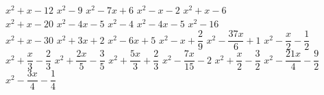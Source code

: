 \begin{esercizio}
\begin{htmulticols}{3}
\begin{enumeratea}
\end{enumeratea}
\end{htmulticols}
\noindent\! \(x^{2} + x - 12\) %
 \(x^{2} - 9\) %
 \(x^{2} - 7 x + 6\) %
 \(x^{2} - x - 2\) %
 \(x^{2} + x - 6\) \\ %
 \(x^{2} + x - 20\) %
 \(x^{2} - 4 x - 5\) %
 \(x^{2} - 4\) %
 \(x^{2} - 4 x - 5\) %
 \(x^{2} - 16\) \\ %
 \(x^{2} + x - 30\) %
 \(x^{2} + 3 x + 2\) %
 \(x^{2} - 6 x + 5\) %
 \(x^{2} - x + \dfrac{2}{9}\) %
 \(x^{2} - \dfrac{37 x}{6} + 1\) %
 \(x^{2} - \dfrac{x}{2} - \dfrac{1}{2}\) %
 \(x^{2} + \dfrac{x}{3} - \dfrac{2}{3}\) %
 \(x^{2} + \dfrac{2 x}{5} - \dfrac{3}{5}\) %
 \(x^{2} + \dfrac{5 x}{3} + \dfrac{2}{3}\) %
 \(x^{2} - \dfrac{7 x}{15} - 2\) %
 \(x^{2} + \dfrac{x}{2} - \dfrac{3}{2}\) %
 \(x^{2} - \dfrac{21 x}{4} - \dfrac{9}{2}\) %
 \(x^{2} - \dfrac{3 x}{4} - \dfrac{1}{4}\) %
\end{esercizio}


